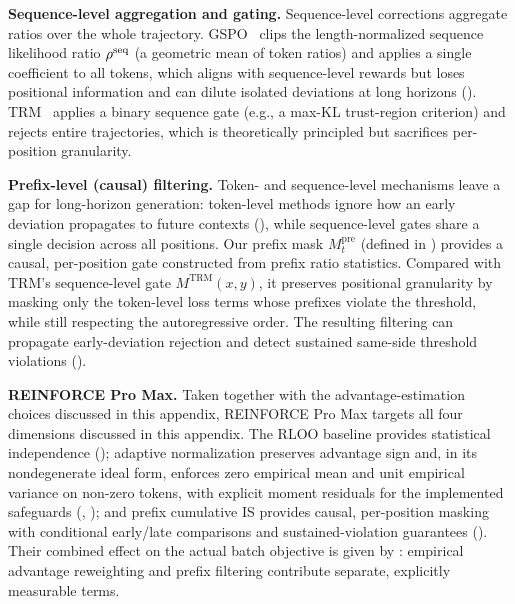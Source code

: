 \textbf{Sequence-level aggregation and gating.} Sequence-level corrections aggregate ratios over the whole trajectory. GSPO~\citep{gspo2025}
clips the length-normalized sequence likelihood ratio $\rho^{\mathrm{seq}}$ (a geometric mean of token ratios) and applies a single coefficient to all
tokens, which aligns with sequence-level rewards but loses positional information and can dilute isolated deviations at long horizons
(). TRM~\citep{li2025trm} applies a binary sequence gate (e.g., a max-KL trust-region criterion) and rejects entire
trajectories, which is theoretically principled but sacrifices per-position granularity.

\textbf{Prefix-level (causal) filtering.} Token- and sequence-level mechanisms leave a gap for long-horizon generation: token-level methods
ignore how an early deviation propagates to future contexts (), while sequence-level gates share a single
decision across all positions. Our prefix mask $M_t^{\mathrm{pre}}$ (defined in ) provides a causal, per-position gate
constructed from prefix ratio statistics. Compared with TRM's sequence-level gate $M^{\mathrm{TRM}}(x,y)$, it preserves positional
granularity by masking only the token-level loss terms whose prefixes violate the threshold, while still respecting the autoregressive
order. The resulting filtering can propagate early-deviation rejection and detect sustained same-side threshold violations
().

\textbf{REINFORCE Pro Max.} Taken together with the advantage-estimation choices discussed in this appendix, REINFORCE Pro Max targets all four
dimensions discussed in this appendix. The RLOO
baseline provides statistical independence (); adaptive normalization preserves advantage sign and, in its
nondegenerate ideal form, enforces zero empirical mean and unit empirical variance on non-zero tokens,
with explicit moment residuals for the implemented safeguards
(, ); and prefix
cumulative IS provides causal, per-position masking with conditional early/late comparisons and sustained-violation guarantees
(). Their combined effect on the actual batch objective is given by
: empirical advantage reweighting and prefix filtering contribute separate, explicitly measurable terms.
